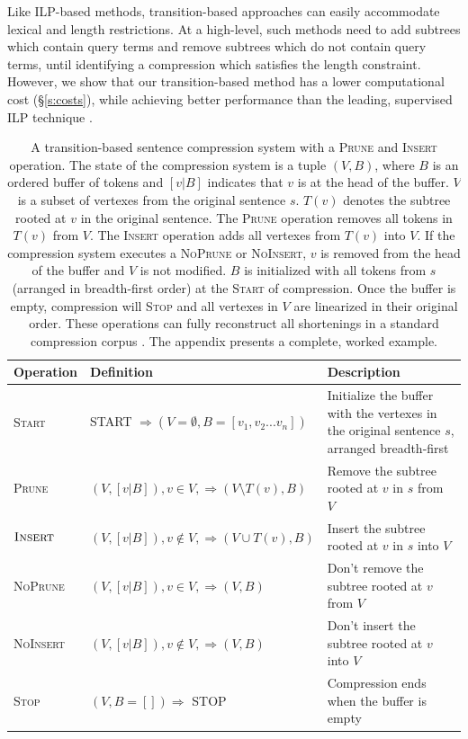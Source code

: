 \documentclass[11pt,a4paper]{article}
\begin{document}
Like ILP-based methods, transition-based approaches can easily accommodate lexical and length restrictions. At a high-level, such methods need to add subtrees which contain query terms and remove subtrees which do not contain query terms, until identifying a compression which satisfies the length constraint. However, we show that our transition-based method has a lower computational cost (\S\ref{s:costs}), while achieving better performance than the leading, supervised ILP technique \cite{filippova2013overcoming}.

\begin{table}[]
\centering
\begin{tabular}{llp{70mm}}
\textbf{Operation} &             \textbf{Definition}                                                    &      \textbf{Description}    \\ \hline
\textsc{Start}      & START $\Rightarrow ( V=\emptyset,  B=[v_1, v_2 ... v_n])$ & Initialize the buffer with the vertexes in the original sentence $s$, arranged breadth-first \\ \hline
\textsc{Prune}              & $(V, [v|B]), v \in V,  \Rightarrow (V \setminus  T(v), B)$ & Remove the subtree rooted at $v$ in $s$ from $V$ \\  
$\textsc{Insert}$             & $(V, [v|B]), v \notin V, \Rightarrow (V \cup T(v), B)$ & Insert the subtree rooted at $v$ in $s$ into $V$  \\ \hline
\textsc{NoPrune}           & $(V, [v|B]), v \in V, \Rightarrow (V, B)$ & Don't remove the subtree rooted at $v$ from $V$  \\ 
\textsc{NoInsert}          &       $(V, [v|B]), v \notin V, \Rightarrow (V, B)$ &   Don't insert the subtree rooted at $v$ into $V$    \\ \hline
\textsc{Stop}             & $ (V, B=[]) \Rightarrow$ STOP & Compression ends when the buffer is empty \\                                               
\end{tabular}
\caption{A transition-based sentence compression system with a \textsc{Prune} and \textsc{Insert} operation. The state of the compression system is a tuple $(V, B)$, where $B$ is an ordered buffer of tokens and $[v|B]$ indicates that $v$ is at the head of the buffer. $V$ is a subset of vertexes from the original sentence $s$. $T(v)$ denotes the subtree rooted at $v$ in the original sentence. The \textsc{Prune} operation removes all tokens in $T(v)$ from $V$. The \textsc{Insert} operation adds all vertexes from $T(v)$ into $V$. If the compression system executes a \textsc{NoPrune} or \textsc{NoInsert}, $v$ is removed from the head of the buffer and $V$ is not modified. $B$ is initialized with all tokens from $s$ (arranged in breadth-first order) at the \textsc{Start} of compression. Once the buffer is empty, compression will \textsc{Stop} and all vertexes in $V$ are linearized in their original order. These operations can fully reconstruct all shortenings in a standard compression corpus \cite{filippova2013overcoming}. The appendix presents a complete, worked example.}
\label{t:ops}
\end{table}
\end{document}
